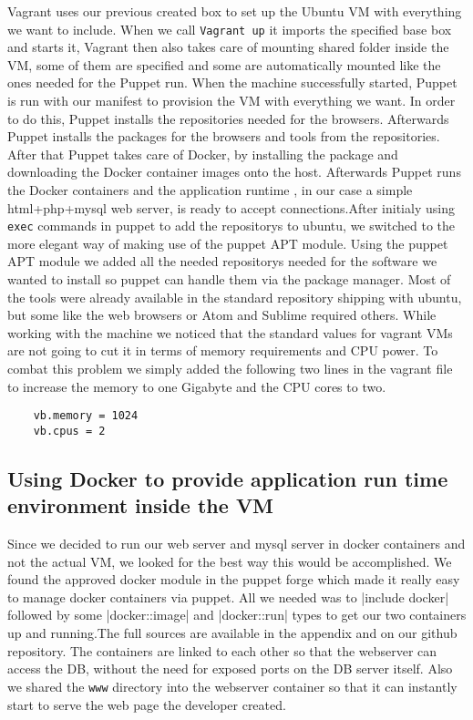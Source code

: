 Vagrant uses our previous created \gls{box} to set up the Ubuntu \gls{VM} with everything we want to include.  When we call \verb|Vagrant up| it imports the specified base \gls{box} and starts it, Vagrant then also takes care of mounting shared folder inside the \gls{VM}, some of them are specified and some are automatically mounted like the ones needed for the Puppet run. When the machine successfully started, Puppet is run with our manifest to provision the \gls{VM} with everything we want. In order to do this, Puppet installs the repositories needed for the browsers. Afterwards Puppet installs the packages for the browsers and tools from the repositories. After that Puppet takes care of Docker, by installing the package and downloading the Docker container images onto the host. Afterwards Puppet runs the Docker containers and the application runtime , in our case a simple html+php+mysql web server, is ready to accept connections.After initialy using \verb|exec|  commands in puppet to add the repositorys to ubuntu, we switched to the more elegant way of making use of the puppet APT module. Using the puppet APT module we added all the needed \glspl{repository} needed for the software we wanted to install so puppet can handle them via the package manager. Most of the tools were already available in the standard \gls{repository} shipping with ubuntu, but some like the web browsers or Atom and Sublime required others.
While working with the machine we noticed that the standard values for vagrant \glspl{VM} are not going to cut it in terms of memory requirements and CPU power. To combat this problem we simply added the following two lines in the vagrant file to increase the memory to one Gigabyte and the CPU cores to two.

\begin{verbatim}
	vb.memory = 1024
	vb.cpus = 2
\end{verbatim}

\subsection{Using Docker to provide application run time environment inside the \gls{VM}}
Since we decided to run our web server and mysql server in docker containers and not the actual \gls{VM}, we looked for the best way this would be accomplished. We found the approved docker module in the puppet forge which made it really easy to manage docker containers via puppet. All we needed was to |include docker| followed by some |docker::image| and |docker::run| types to get our two containers up and running.The full sources are available in the appendix and on our github repository. The containers are linked to each other so that the webserver can access the DB, without the need for exposed ports on the DB server itself. Also we shared the \verb|www| directory into the webserver container so that it can instantly start to serve the web page the developer created.

